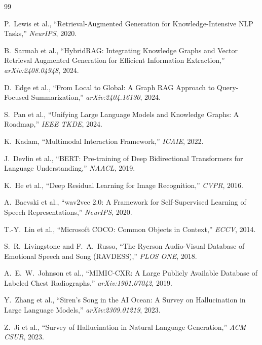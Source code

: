 \documentclass[12pt,a4paper]{article}
\theoremstyle{definition}
\theoremstyle{plain}
\theoremstyle{remark}
\begin{document}
\newpage

\begin{thebibliography}{99}

P.\ Lewis et al., ``Retrieval-Augmented Generation for Knowledge-Intensive NLP Tasks,'' \textit{NeurIPS}, 2020.

B.\ Sarmah et al., ``HybridRAG: Integrating Knowledge Graphs and Vector Retrieval Augmented Generation for Efficient Information Extraction,'' \textit{arXiv:2408.04948}, 2024.

D.\ Edge et al., ``From Local to Global: A Graph RAG Approach to Query-Focused Summarization,'' \textit{arXiv:2404.16130}, 2024.

S.\ Pan et al., ``Unifying Large Language Models and Knowledge Graphs: A Roadmap,'' \textit{IEEE TKDE}, 2024.

K.\ Kadam, ``Multimodal Interaction Framework,'' \textit{ICAIE}, 2022.

J.\ Devlin et al., ``BERT: Pre-training of Deep Bidirectional Transformers for Language Understanding,'' \textit{NAACL}, 2019.

K.\ He et al., ``Deep Residual Learning for Image Recognition,'' \textit{CVPR}, 2016.

A.\ Baevski et al., ``wav2vec 2.0: A Framework for Self-Supervised Learning of Speech Representations,'' \textit{NeurIPS}, 2020.

T.-Y.\ Lin et al., ``Microsoft COCO: Common Objects in Context,'' \textit{ECCV}, 2014.

S.\ R.\ Livingstone and F.\ A.\ Russo, ``The Ryerson Audio-Visual Database of Emotional Speech and Song (RAVDESS),'' \textit{PLOS ONE}, 2018.

A.\ E.\ W.\ Johnson et al., ``MIMIC-CXR: A Large Publicly Available Database of Labeled Chest Radiographs,'' \textit{arXiv:1901.07042}, 2019.

Y.\ Zhang et al., ``Siren's Song in the AI Ocean: A Survey on Hallucination in Large Language Models,'' \textit{arXiv:2309.01219}, 2023.

Z.\ Ji et al., ``Survey of Hallucination in Natural Language Generation,'' \textit{ACM CSUR}, 2023.


\end{thebibliography}
\end{document}
